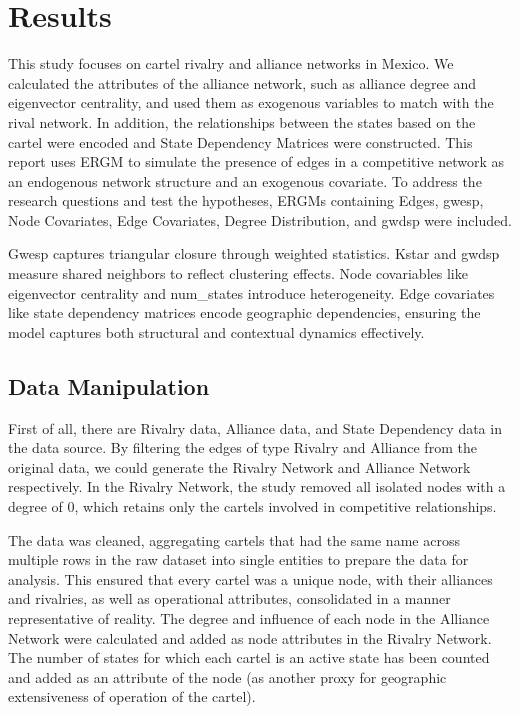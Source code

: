 \documentclass[
]{article}
\begin{document}
\section{Results}\label{results}

This study focuses on cartel rivalry and alliance networks in Mexico. We
calculated the attributes of the alliance network, such as alliance
degree and eigenvector centrality, and used them as exogenous variables
to match with the rival network. In addition, the relationships between
the states based on the cartel were encoded and State Dependency
Matrices were constructed. This report uses ERGM to simulate the
presence of edges in a competitive network as an endogenous network
structure and an exogenous covariate. To address the research questions
and test the hypotheses, ERGMs containing Edges, gwesp, Node Covariates,
Edge Covariates, Degree Distribution, and gwdsp were included.

Gwesp captures triangular closure through weighted statistics. Kstar and
gwdsp measure shared neighbors to reflect clustering effects. Node
covariables like eigenvector centrality and num\_states introduce
heterogeneity. Edge covariates like state dependency matrices encode
geographic dependencies, ensuring the model captures both structural and
contextual dynamics effectively.

\subsection{Data Manipulation}\label{data-manipulation}

First of all, there are Rivalry data, Alliance data, and State
Dependency data in the data source. By filtering the edges of type
Rivalry and Alliance from the original data, we could generate the
Rivalry Network and Alliance Network respectively. In the Rivalry
Network, the study removed all isolated nodes with a degree of 0, which
retains only the cartels involved in competitive relationships.

The data was cleaned, aggregating cartels that had the same name across
multiple rows in the raw dataset into single entities to prepare the
data for analysis. This ensured that every cartel was a unique node,
with their alliances and rivalries, as well as operational attributes,
consolidated in a manner representative of reality. The degree and
influence of each node in the Alliance Network were calculated and added
as node attributes in the Rivalry Network. The number of states for
which each cartel is an active state has been counted and added as an
attribute of the node (as another proxy for geographic extensiveness of
operation of the cartel).
\end{document}
